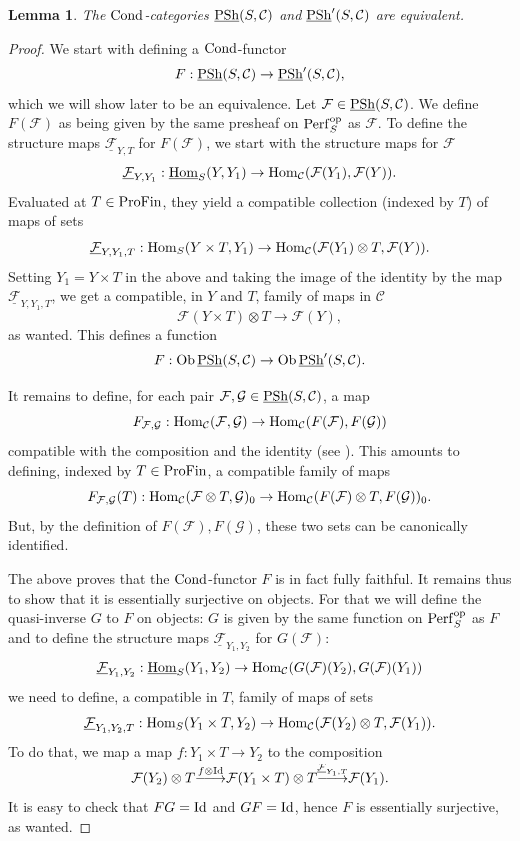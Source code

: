 \documentclass[10pt]{amsart}
\newtheorem{lemma}[equation]{Lemma}
\theoremstyle{definition}
\theoremstyle{remark}
\def\lomapr#1{\smash{\mathop{\relbar\joinrel\longrightarrow}\limits^{#1}}}
\newcommand{\Hom}{{\rm{Hom}} }
\newcommand{\uHom}{\underline{{\rm{Hom}} }}
\newcommand{\sff}{{\mathcal{F}}}
\newcommand{\sg}{{\mathcal{G}}}
\newcommand{\scc}{{\mathcal{C}}}
\numberwithin{equation}{section}
\numberwithin{equation}{section}
\begin{document}
  \begin{lemma}\label{goraco1}
The ${\rm Cond}$-categories $\underline{{\rm PSh}}(S,\scc)$ and $\underline{{\rm PSh}}^{\prime}(S,\scc)$  are equivalent. 
\end{lemma}
\begin{proof}  We start with defining  a ${\rm Cond}$-functor $$F: \underline{{\rm PSh}}(S,\scc)\to \underline{{\rm PSh}}^{\prime}(S,\scc),$$ which we will show later to be an equivalence.  Let $\sff\in  \underline{{\rm PSh}}(S,\scc)$. We define $F(\sff)$ as being given by the same presheaf on ${\rm Perf}^{\rm op}_S$ as $\sff$.  To define  the structure maps $\underline{\sff}_{Y, T}$ for $F(\sff)$, we start with the structure maps for $\sff$
$$
\underline{\sff}_{Y, Y_1}: \uHom_S(Y,Y_1)\to \Hom_{\scc}(\sff(Y_1),\sff(Y)).
$$
Evaluated at $T\in {\rm ProFin}$, they yield a compatible collection (indexed by $T$) of maps of sets
$$
\underline{\sff}_{Y,Y_1,T}: \Hom_S(Y\times T, Y_1)\to \Hom_{\scc}(\sff(Y_1)\otimes {T},\sff(Y)).
$$
Setting $Y_1=Y\times T$ in the above and taking the image of the identity by the map $\underline{\sff}_{Y,Y_1,T}$,  we get a compatible, in $Y$ and $T$, family of maps in $\scc$
$$
\sff(Y\times T)\otimes {T}\to \sff(Y),
$$
as wanted. This defines a function
$$
F: {\rm Ob}\, \underline{{\rm PSh}}(S,\scc)\to {\rm Ob}\, \underline{{\rm PSh}}^{\prime}(S,\scc).  
$$

  It remains to define, for each pair $\sff,\sg\in \underline{{\rm PSh}}(S,\scc)$, a map 
  $$
  F_{\sff,\sg}: \Hom_{\scc}(\sff,\sg)\to \Hom_{\scc}(F(\sff),F(\sg))
  $$
compatible with  the composition and the identity (see \cite[(1.5), (1.6)]{Kelly}). This amounts to defining, indexed by $T\in {\rm ProFin}$, a compatible family of maps
$$
  F_{\sff,\sg}(T): \Hom_{\scc}(\sff\otimes{T},\sg)_0\to \Hom_{\scc}(F(\sff)\otimes{T},F(\sg))_0.
$$
But, by the definition of $F(\sff), F(\sg)$, these two sets can be canonically identified. 

 The above proves that the ${\rm Cond}$-functor $F$  is in fact fully faithful. It remains thus to show that it is essentially surjective on objects. 
 For that we will  define the quasi-inverse $G$ to $F$ on objects:    $G$ is  given by the same function on ${\rm Perf}^{\rm op}_S$ as $F$ and  to define  the structure maps $\underline{\sff}_{Y_1, Y_2}$ for $G(\sff)$:
$$
\underline{\sff}_{Y_1, Y_2}: \uHom_S(Y_1,Y_2)\to \Hom_{\scc}(G(\sff)(Y_2),G(\sff)(Y_1))
$$
we need to define, a compatible  in $T$, family of maps of sets
$$
\underline{\sff}_{Y_1, Y_2,T}: \Hom_S(Y_1\times T,Y_2)\to \Hom_{\scc}(\sff(Y_2)\otimes {T},\sff(Y_1)).
$$
To do that, we map a map  $f:Y_1\times T\to Y_2$ to the composition 
$$
\sff(Y_2)\otimes{T}\lomapr{f\otimes{\rm Id}}\sff(Y_1\times T)\otimes{T}\lomapr{\underline{\sff}_{Y_1,T}}\sff(Y_1).
$$
It is easy to check that $FG={\rm Id}$ and $GF={\rm Id}$, hence $F$ is essentially surjective, as wanted.
\end{proof}
\end{document}
